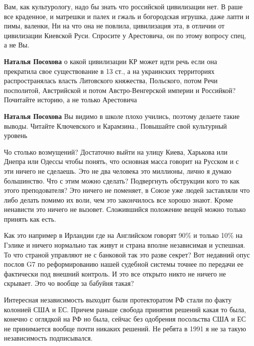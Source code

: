 \begin{itemize}
Вам, как культурологу, надо бы знать что российской цивилизации нет. В раше все
краденное, и матрешки и палех и гжаль и богородская игрушка, даже лапти и
пимы, валенки, Ни на что она не повлила, цивилизация эта, в отличии от цивилизации
Киевской Руси. Спросите у Арестовича, он по этому вопросу спец, а не Вы.

\begin{itemize}

\textbf{Наталья Посохова} о какой цивилизации КР может идти речь если она
прекратила свое существование в 13 ст., а на украинских территориях
распространялась власть Литовского княжества, Польского, потом Речи посполитой,
Австрийской и потом Австро-Венгерской империи и Российкой? Почитайте историю, а
не только Арестовича


\textbf{Наталья Посохова} Вы видимо в школе плохо учились, поэтому делаете
такие выводы. Читайте Ключевского и Карамзина., Повышайте свой культурный
уровень
\end{itemize}



Чо столько возмущений? Достаточно выйти на улицу Киева, Харькова или Днепра или
Одессы чтобы понять, что основная масса говорит на Русском и с эти ничего не
сделаешь. Это не два человека это миллионы, лично я думаю большинство. Что с
этим можно сделать? Подвергнуть обструкции кого то как этого преподователя? Это
ничего не поменяет, в Союзе уже людей заставляли что либо делать помимо их
воли, чем это закончилось все хорошо знают. Кроме ненависти это ничего не
вызовет. Сложившийся положение вещей можно только принять как есть. 

Как это например в Ирландии где на Английском говорят 90\% и только 10\% на
Гэлике и ничего нормально так живут и страна вполне независимая и успешная. То
что страной управляют не с банковой так это разве секрет? Вот недавний опус
послов G7 по реформированию нашей судебной системы точнее по передачи ее
фактически под внешний контроль. И это все открыто никто не ничего не скрывает.
Это чо вообще за бабуйня такая? 

Интересная независимость выходит были протекторатом РФ
стали по факту колонией США и ЕС. Причем раньше свобода принятия решений какая
то была, конечно с оглядкой на РФ но была, сейчас без одобрения посольства США
и ЕС не принимается вообще почти никаких решений. Не ребята в 1991 я не за
такую независимость подписывался.


\end{itemize}
